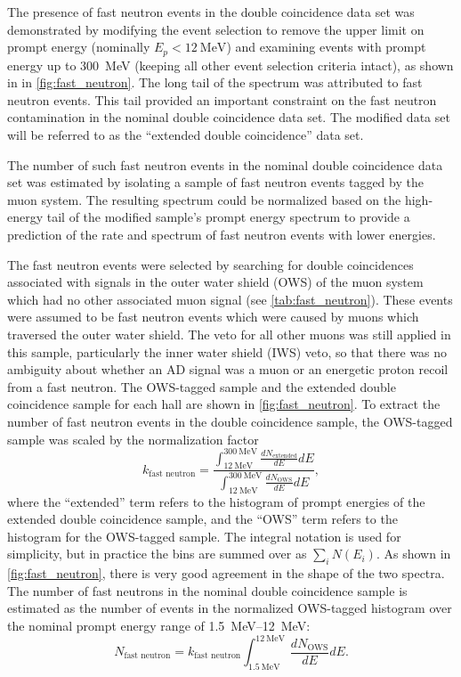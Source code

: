 The presence of fast neutron events in the double coincidence data set
was demonstrated by modifying the event selection
to remove the upper limit on prompt energy (nominally $E_p < \SI{12}{\MeV}$)
and examining events with prompt energy up to \SI{300}{\MeV}
(keeping all other event selection criteria intact),
as shown in in \cref{fig:fast_neutron}.
The long tail of the spectrum was attributed to fast neutron events.
This tail provided an important constraint on the fast neutron contamination
in the nominal double coincidence data set.
The modified data set will be referred to as the
``extended double coincidence'' data set.

The number of such fast neutron events in the nominal double coincidence data set
was estimated by isolating a sample of fast neutron events
tagged by the muon system.
The resulting spectrum could be normalized based on the high-energy tail
of the modified sample's prompt energy spectrum
to provide a prediction of the rate and spectrum of fast neutron events
with lower energies.

The fast neutron events were selected by searching for
double coincidences associated with signals
in the outer water shield (OWS) of the muon system
which had no other associated muon signal
(see \cref{tab:fast_neutron}).
These events were assumed to be fast neutron events
which were caused by muons which traversed the outer water shield.
The veto for all other muons was still applied in this sample,
particularly the inner water shield (IWS) veto,
so that there was no ambiguity about whether an AD signal
was a muon or an energetic proton recoil from a fast neutron.
The OWS-tagged sample and the extended double coincidence sample for each hall
are shown in \cref{fig:fast_neutron}.
To extract the number of fast neutron events in the double coincidence sample,
the OWS-tagged sample was scaled by the normalization factor
\begin{equation}\label{eq:fast_neutron_integral}
    k_\text{fast neutron} = \frac{
        \int_{\SI{12}{\MeV}}^{\SI{300}{\MeV}} \frac{dN_{\text{extended}}}{dE} dE
    }{
        \int_{\SI{12}{\MeV}}^{\SI{300}{\MeV}} \frac{dN_{\text{OWS}}}{dE} dE
    },
\end{equation}
where the ``extended'' term refers to the histogram of prompt energies
of the extended double coincidence sample,
and the ``OWS'' term refers to the histogram for the OWS-tagged sample.
The integral notation is used for simplicity,
but in practice the bins are summed over as $\sum_i N(E_i)$.
As shown in \cref{fig:fast_neutron},
there is very good agreement in the shape of the two spectra.
The number of fast neutrons in the nominal double coincidence sample
is estimated as the number of events in the normalized OWS-tagged histogram
over the nominal prompt energy range of \SIrange{1.5}{12}{\MeV}:
\begin{equation}\label{eq:fast_neutron_count}
    N_\text{fast neutron} = k_\text{fast neutron}
    \int_{\SI{1.5}{\MeV}}^{\SI{12}{\MeV}} \frac{dN_{\text{OWS}}}{dE} dE.
\end{equation}

